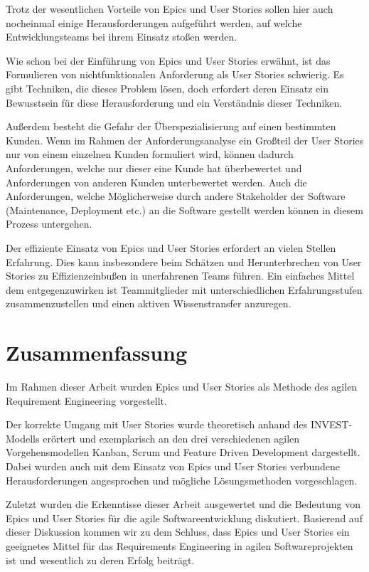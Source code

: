 \documentclass[acmtog]{acmart}
\begin{document}
Trotz der wesentlichen Vorteile von Epics und User Stories sollen hier auch nocheinmal einige Herausforderungen aufgeführt
werden, auf welche Entwicklungsteams bei ihrem Einsatz stoßen werden.

Wie schon bei der Einführung von Epics und User Stories erwähnt, ist das Formulieren von nichtfunktionalen Anforderung als User Stories
schwierig. Es gibt Techniken, die dieses Problem lösen, doch erfordert deren Einsatz ein Bewusstsein für diese Herausforderung und ein Verständnis dieser Techniken.

Außerdem besteht die Gefahr der Überspezialisierung auf einen bestimmten Kunden.
Wenn im Rahmen der Anforderungsanalyse ein Großteil der User Stories nur von einem einzelnen Kunden formuliert wird,
können dadurch Anforderungen, welche nur dieser eine Kunde hat überbewertet und Anforderungen von anderen Kunden unterbewertet werden.
Auch die Anforderungen, welche Möglicherweise durch andere Stakeholder der Software (Maintenance, Deployment etc.) an die Software gestellt werden
können in diesem Prozess untergehen.

Der effiziente Einsatz von Epics und User Stories erfordert an vielen Stellen Erfahrung.
Dies kann insbesondere beim Schätzen und Herunterbrechen von User Stories zu Effizienzeinbußen
in unerfahrenen Teams führen. Ein einfaches Mittel dem entgegenzuwirken ist Teammitglieder mit unterschiedlichen
Erfahrungsstufen zusammenzustellen und einen aktiven Wissenstransfer anzuregen.

\section{Zusammenfassung}
Im Rahmen dieser Arbeit wurden Epics und User Stories als Methode des agilen Requirement Engineering vorgestellt.

Der korrekte Umgang mit User Stories wurde theoretisch anhand des INVEST-Modells erörtert und exemplarisch
an den drei verschiedenen agilen Vorgehensmodellen Kanban, Scrum und Feature Driven Development dargestellt.
Dabei wurden auch mit dem Einsatz von Epics und User Stories verbundene Herausforderungen angesprochen und mögliche
Lösungsmethoden vorgeschlagen.

Zuletzt wurden die Erkenntisse dieser Arbeit ausgewertet und die Bedeutung von Epics und User Stories für die agile Softwareentwicklung
diskutiert.
Basierend auf dieser Diskussion kommen wir zu dem Schluss, dass Epics und User Stories ein geeignetes Mittel für das
Requirements Engineering in agilen Softwareprojekten ist und wesentlich zu deren Erfolg beiträgt.
\end{document}

